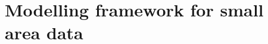 \documentclass[slidestop,compress,serif,10pt]{beamer}
\begin{document}
\section{Modelling framework for small area data}
\end{document}
